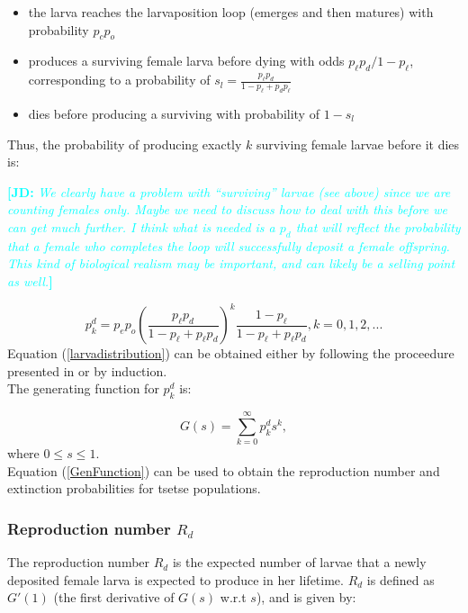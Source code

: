 \documentclass[smallextended]{svjour3}
\newcommand{\comment}[3]{\textcolor{#1}{\textbf{[#2: }\textit{#3}\textbf{]}}}
\newcommand{\jd}[1]{\comment{cyan}{JD}{#1}}
\begin{document}
\begin{itemize}
\item the larva reaches the larvaposition loop (emerges and then matures) with probability $p_c p_o$
\item produces a surviving female larva before dying with odds $p_\ell p_d / 1-p_\ell$, corresponding to a probability of $s_l = \frac{p_\ell p_d}{1 - p_\ell + p_d p_\ell}$
\item dies before producing a surviving with probability of $1-s_l$
\end{itemize} 

Thus, the probability of producing exactly $k$ surviving female larvae before it dies is:

\jd{We clearly have a problem with ``surviving'' larvae (see above) since we are counting females only. Maybe we need to discuss how to deal with this before we can get much further. I think what is needed is a $p_d$ that will reflect the probability that a female who completes the loop will successfully deposit a female offspring. This kind of biological realism may be important, and can likely be a selling point as well.}

\begin{equation}
\label{larvadistribution}
p_{k}^{d} = p_{e}p_{o}(\frac{p_\ell p_d}{1-p_\ell + p_\ell p_d})^{k}\frac{1-p_\ell}{1-p_\ell + p_\ell p_d}, k =0,1,2,...
\end{equation} 
Equation (\ref{larvadistribution}) can be obtained either by following the proceedure presented in \cite{Kajunguri2019} or by induction.\\

The generating function for  $p_{k}^{d}$ is:

\begin{equation}
\label{GenFunction}
 G(s) = \sum_{k=0}^{\infty} p_{k}^{d}s^{k},  
\end{equation}
where $ 0\leq s \leq 1.$ \\

Equation (\ref{GenFunction}) can be used to obtain the reproduction number and extinction probabilities for tsetse populations. 

\subsubsection{Reproduction number $R_{d}$}

The reproduction number $R_{d}$ is the expected number of larvae that a newly deposited female larva is expected to produce in her lifetime. $R_{d}$ is defined as $G'(1)$ (the first derivative of $G(s)$ w.r.t $s$), and is given by:
\end{document}
